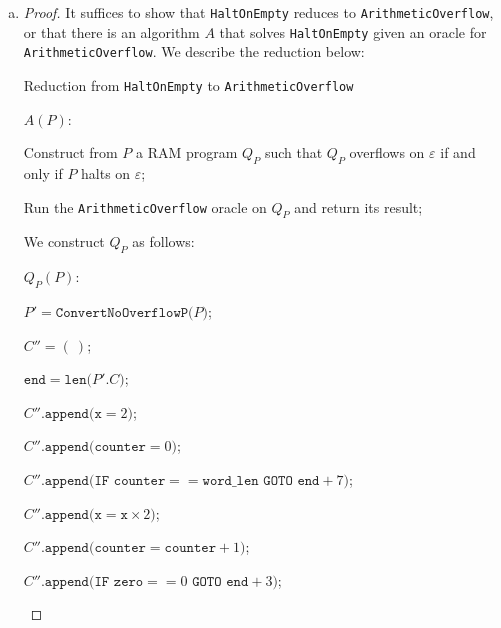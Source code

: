 \documentclass[11pt]{scrartcl}
\theoremstyle{dotlessP}
\theoremstyle{dotlessN}
\begin{document}
\begin{enumerate}[(a)]
\begin{proof}
From Theorem 7.1 in Lecture 7, for every RAM program $P$, there exists a Word-RAM Program $P'$ such that $P'$ halts on $x$ if and only if $P$ halts on $x$, and if they halt, then $P'(x) = P(x)$. It follows then that, if we show that, for every Word-RAM Program $P'$ there exists a Word-RAM Program $P''$ such that $P'$ halts on $x$ if and only if $P'$ halts on $x$, and if they halt, then $P''(x) = P'(x)$, by transitivity of biconditional statements, our proof is complete.
		\end{proof}
	\item 
		\begin{proof}
			It suffices to show that \texttt{HaltOnEmpty} reduces to \texttt{ArithmeticOverflow}, or that there is an algorithm $A$ that solves \texttt{HaltOnEmpty} given an oracle for \texttt{ArithmeticOverflow}. We describe the reduction below:
\begin{algorithm}                
	\caption{Reduction from \texttt{HaltOnEmpty} to \texttt{ArithmeticOverflow}}
  $A(P)$:

  Construct from $P$ a RAM program $Q_P$ such that $Q_P$ overflows on $\varepsilon$ if and only if $P$ halts on $\varepsilon$;

	Run the \texttt{ArithmeticOverflow} oracle on $Q_P$ and return its result;
\end{algorithm}

We construct $Q_P$ as follows:

\begin{algorithm}[H]
  $Q_P(P)$:

  $P' = \texttt{ConvertNoOverflowP($P$)}$;
  
  $C'' = (\ )$;

	$\texttt{end} = \texttt{len($P'.C$)}$;

  $C''\texttt{.append($\texttt{x} = 2$)}$;

	  $C''\texttt{.append($\texttt{counter} = 0$)}$;

	  $C''\texttt{.append($\texttt{IF } \texttt{counter} == \texttt{word\_len} \texttt{ GOTO } \texttt{end} + 7$)}$;

	  $C''\texttt{.append($\texttt{x} = \texttt{x} \times 2$)}$;

	  $C''\texttt{.append($\texttt{counter} = \texttt{counter} + 1$)}$;

	  $C''\texttt{.append($\texttt{IF } \texttt{zero} == 0 \texttt{ GOTO } \texttt{end} + 3$)}$;


\end{algorithm}
\end{proof}
\end{enumerate}
\end{document}
